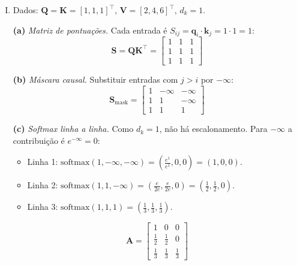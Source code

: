 \documentclass{dlproblemset}
\begin{document}
\begin{enumerate}[I)]
\begin{enumerate}[a)]
    \item \textbf{F.} A descrição da MQA está invertida. \textit{Modificação:} ``\textit{Multi-Query Attention} (MQA) mantém $H$ cabeças \emph{apenas em Q}, mas usa \emph{uma única cabeça compartilhada} para K e V. É justamente essa \emph{redução das cabeças de K e V} (não de Q) que diminui o \textit{KV-cache} durante a inferência. \textit{Grouped-Query Attention} (GQA) generaliza isso: $G$ grupos para K/V com $1 < G < H$.''
\end{enumerate}

\item Dados: $\mathbf{Q} = \mathbf{K} = [1, 1, 1]^\top$, $\mathbf{V} = [2, 4, 6]^\top$, $d_k = 1$.

\textbf{(a)} \textit{Matriz de pontuações.} Cada entrada é $S_{ij} = \mathbf{q}_i \cdot \mathbf{k}_j = 1 \cdot 1 = 1$:
\[
\mathbf{S} = \mathbf{Q}\mathbf{K}^\top = \begin{bmatrix}
1 & 1 & 1 \\
1 & 1 & 1 \\
1 & 1 & 1
\end{bmatrix}
\]

\textbf{(b)} \textit{Máscara causal.} Substituir entradas com $j > i$ por $-\infty$:
\[
\mathbf{S}_\text{mask} = \begin{bmatrix}
1      & -\infty & -\infty \\
1      & 1       & -\infty \\
1      & 1       & 1
\end{bmatrix}
\]

\textbf{(c)} \textit{Softmax linha a linha.} Como $d_k = 1$, não há escalonamento. Para $-\infty$ a contribuição é $e^{-\infty} = 0$:
\begin{itemize}
    \item Linha 1: $\mathrm{softmax}(1, -\infty, -\infty) = \left(\tfrac{e^1}{e^1}, 0, 0\right) = (1, 0, 0)$.
    \item Linha 2: $\mathrm{softmax}(1, 1, -\infty) = \left(\tfrac{e}{2e}, \tfrac{e}{2e}, 0\right) = (\tfrac{1}{2}, \tfrac{1}{2}, 0)$.
    \item Linha 3: $\mathrm{softmax}(1, 1, 1) = (\tfrac{1}{3}, \tfrac{1}{3}, \tfrac{1}{3})$.
\end{itemize}
\[
\mathbf{A} = \begin{bmatrix}
1            & 0            & 0            \\
\tfrac{1}{2} & \tfrac{1}{2} & 0            \\
\tfrac{1}{3} & \tfrac{1}{3} & \tfrac{1}{3}
\end{bmatrix}
\]


\end{enumerate}
\end{document}
